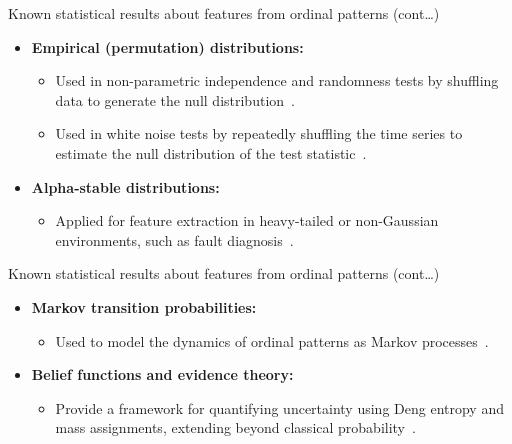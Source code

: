 \documentclass{beamer}
\begin{document}
\begin{frame}{Known statistical results about features from ordinal patterns (cont\dots)}
	\begin{itemize}
		\item \textbf{Empirical (permutation) distributions:}
		\begin{itemize}
			\item Used in non-parametric independence and randomness tests by shuffling data to generate the null distribution~\cite{MatillaGarcia2008, AshtariNezhad2019}.
			\item Used in white noise tests by repeatedly shuffling the time series to estimate the null distribution of the test statistic~\cite{Chagas2022a}.
		\end{itemize}
		\item \textbf{Alpha-stable distributions:}
		\begin{itemize}
			\item Applied for feature extraction in heavy-tailed or non-Gaussian environments, such as fault diagnosis~\cite{Chouri2014}.
		\end{itemize}
	\end{itemize}
\end{frame}

\begin{frame}{Known statistical results about features from ordinal patterns (cont\dots)}
	\begin{itemize}
		\item \textbf{Markov transition probabilities:}
		\begin{itemize}
			\item Used to model the dynamics of ordinal patterns as Markov processes~\cite{Sakellariou2019}.
		\end{itemize}
		\item \textbf{Belief functions and evidence theory:}
		\begin{itemize}
			\item Provide a framework for quantifying uncertainty using Deng entropy and mass assignments, extending beyond classical probability~\cite{Xie2025}.
		\end{itemize}
	\end{itemize}
\end{frame}
\end{document}
